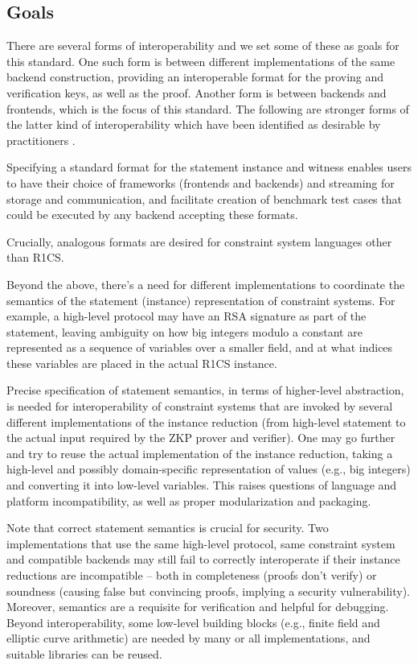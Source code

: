 \documentclass[a4paper,12pt]{article}
\begin{document}
\subsection{Goals} 
\label{goals}

There are several forms of interoperability and we set some of these as goals for this standard. One such form is between different implementations of the same backend construction, providing an interoperable format for the proving and verification keys, as well as the proof. Another form is between backends and frontends, which is the focus of this standard. The following are stronger forms of the latter kind of interoperability which have been identified as desirable by practitioners \cite{ZKProofImplementation}.

Specifying a standard format for the statement instance and witness enables users to have their choice of frameworks (frontends and backends) and streaming for storage and communication, and facilitate creation of benchmark test cases that could be executed by any backend accepting these formats.
 
Crucially, analogous formats are desired for constraint system languages other than R1CS.


Beyond the above, there’s a need for different implementations to coordinate the semantics of the statement (instance) representation of constraint systems. For example, a high-level protocol may have an RSA signature as part of the statement, leaving ambiguity on how big integers modulo a constant are represented as a sequence of variables over a smaller field, and at what indices these variables are placed in the actual R1CS instance.

Precise specification of statement semantics, in terms of higher-level abstraction, is needed for interoperability of constraint systems that are invoked by several different implementations of the instance reduction (from high-level statement to the actual input required by the ZKP prover and verifier). One may go further and try to reuse the actual implementation of the instance reduction, taking a high-level and possibly domain-specific representation of values (e.g., big  integers) and converting it into low-level variables. This raises questions of language and platform incompatibility, as well as proper modularization and packaging.

Note that correct statement semantics is crucial for security. Two implementations that use the same high-level protocol, same constraint system and compatible backends may still fail to correctly interoperate if their instance reductions are incompatible -- both in completeness (proofs don’t verify) or soundness (causing false but convincing proofs, implying a security vulnerability). Moreover, semantics are a requisite for verification and helpful for debugging. Beyond interoperability, some low-level building blocks (e.g., finite field and elliptic curve arithmetic) are needed by many or all implementations, and suitable libraries can be reused.
\end{document}
